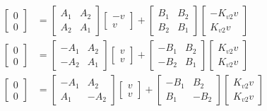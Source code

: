 \begin{align*}
  \begin{bmatrix}
    0 \\
    0
  \end{bmatrix} &=
    \begin{bmatrix}
      A_1 & A_2 \\
      A_2 & A_1
    \end{bmatrix}
    \begin{bmatrix}
      -v \\
      v
    \end{bmatrix} +
    \begin{bmatrix}
      B_1 & B_2 \\
      B_2 & B_1
    \end{bmatrix}
    \begin{bmatrix}
      -K_{v2} v \\
      K_{v2} v
    \end{bmatrix} \\
  \begin{bmatrix}
    0 \\
    0
  \end{bmatrix} &=
    \begin{bmatrix}
      -A_1 & A_2 \\
      -A_2 & A_1
    \end{bmatrix}
    \begin{bmatrix}
      v \\
      v
    \end{bmatrix} +
    \begin{bmatrix}
      -B_1 & B_2 \\
      -B_2 & B_1
    \end{bmatrix}
    \begin{bmatrix}
      K_{v2} v \\
      K_{v2} v
    \end{bmatrix} \\
  \begin{bmatrix}
    0 \\
    0
  \end{bmatrix} &=
    \begin{bmatrix}
      -A_1 & A_2 \\
      A_1 & -A_2
    \end{bmatrix}
    \begin{bmatrix}
      v \\
      v
    \end{bmatrix} +
    \begin{bmatrix}
      -B_1 & B_2 \\
      B_1 & -B_2
    \end{bmatrix}
    \begin{bmatrix}
      K_{v2} v \\
      K_{v2} v
    \end{bmatrix}
\end{align*}

